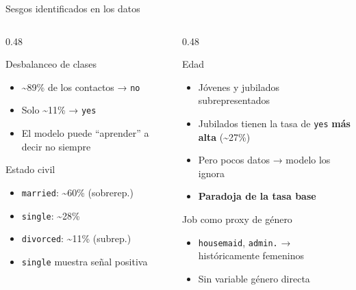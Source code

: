 \documentclass[aspectratio=169, 11pt]{beamer}
\begin{document}
\begin{frame}{Sesgos identificados en los datos}
\begin{columns}[T]
\begin{column}{0.48\textwidth}
\begin{block}{\faChartPie\quad Desbalanceo de clases}
\begin{itemize}
\item \textasciitilde89\% de los contactos → \texttt{no}
\item Solo \textasciitilde11\% → \texttt{yes}
\item El modelo puede ``aprender'' a decir no siempre
\end{itemize}
\end{block}
\vspace{4pt}
\begin{block}{\faUsers\quad Estado civil}
\begin{itemize}
\item \texttt{married}: \textasciitilde60\% (sobrerep.)
\item \texttt{single}: \textasciitilde28\%
\item \texttt{divorced}: \textasciitilde11\% (subrep.)
\item \texttt{single} muestra señal positiva
\end{itemize}
\end{block}
\end{column}
\begin{column}{0.48\textwidth}
\begin{block}{\faBirthdayCake\quad Edad}
\begin{itemize}
\item Jóvenes y jubilados subrepresentados
\item Jubilados tienen la tasa de \texttt{yes} \textbf{más alta} (\textasciitilde27\%)
\item Pero pocos datos → modelo los ignora
\item \textbf{Paradoja de la tasa base}
\end{itemize}
\end{block}
\vspace{4pt}
\begin{block}{\faBriefcase\quad Job como proxy de género}
\begin{itemize}
\item \texttt{housemaid}, \texttt{admin.} → históricamente femeninos
\item Sin variable género directa
\end{itemize}
\end{block}
\end{column}
\end{columns}
\end{frame}
\end{document}
